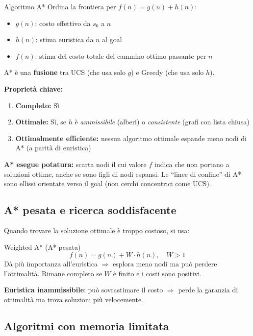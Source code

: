 \documentclass[12pt,a4paper]{article}
\begin{document}
\begin{thmbox}{Algoritmo A*}
Ordina la frontiera per $f(n) = g(n) + h(n)$:
\begin{itemize}[noitemsep]
  \item $g(n)$: costo effettivo da $s_0$ a $n$
  \item $h(n)$: stima euristica da $n$ al goal
  \item $f(n)$: stima del costo totale del cammino ottimo passante per $n$
\end{itemize}
A* è una \textbf{fusione} tra UCS (che usa solo $g$) e Greedy (che usa solo $h$).

\textbf{Proprietà chiave:}
\begin{enumerate}[noitemsep]
  \item \textbf{Completo:} Sì
  \item \textbf{Ottimale:} Sì, se $h$ è \emph{ammissibile} (alberi) o \emph{consistente} (grafi con lista chiusa)
  \item \textbf{Ottimalmente efficiente:} nessun algoritmo ottimale espande meno nodi di A* (a parità di euristica)
\end{enumerate}

\textbf{A* esegue potatura:} scarta nodi il cui valore $f$ indica che non portano a soluzioni ottime, anche se sono figli di nodi espansi. Le ``linee di confine'' di A* sono ellissi orientate verso il goal (non cerchi concentrici come UCS).
\end{thmbox}

\subsection{A* pesata e ricerca soddisfacente}

Quando trovare la soluzione ottimale è troppo costoso, si usa:

\begin{defbox}{Weighted A* (A* pesata)}
\[ f(n) = g(n) + W \cdot h(n), \quad W > 1 \]
Dà più importanza all'euristica $\Rightarrow$ esplora meno nodi ma può perdere l'ottimalità. Rimane completo se $W$ è finito e i costi sono positivi.

\textbf{Euristica inammissibile}: può sovrastimare il costo $\Rightarrow$ perde la garanzia di ottimalità ma trova soluzioni più velocemente.
\end{defbox}

\subsection{Algoritmi con memoria limitata}
\end{document}
